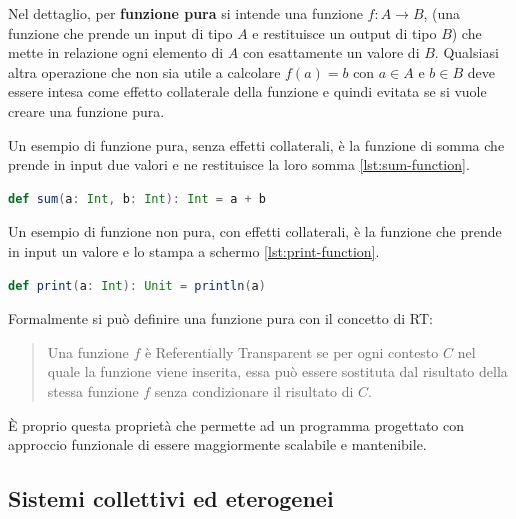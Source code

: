 \documentclass[12pt,a4paper,openright,twoside]{book}
\begin{document}
\label{sec:fp}
Nel dettaglio, per \textbf{funzione pura} si intende una funzione $f:A\to B$, (una funzione che prende un input di tipo $A$ e restituisce un output di tipo $B$) che mette in relazione ogni elemento di $A$ con esattamente un valore di $B$. Qualsiasi altra operazione che non sia utile a calcolare $f(a)=b$ con $a\in A$ e $b\in B$ deve essere intesa come effetto collaterale della funzione e quindi evitata se si vuole creare una funzione pura.

Un esempio di funzione pura, senza effetti collaterali, è la funzione di somma che prende in input due valori e ne restituisce la loro somma \cref{lst:sum-function}. 

\begin{lstlisting}[language=Scala, label={lst:sum-function}, caption={Esempio di funzione pura in Scala}]
    def sum(a: Int, b: Int): Int = a + b
\end{lstlisting}

Un esempio di funzione non pura, con effetti collaterali, è la funzione che prende in input un valore e lo stampa a schermo \cref{lst:print-function}.

\begin{lstlisting}[language=Scala, label={lst:print-function}, caption={Esempio di funzione non pura in Scala}]
    def print(a: Int): Unit = println(a)
\end{lstlisting}

Formalmente si può definire una funzione pura con il concetto di \ac{RT}\cite{Hunt2018}:

\begin{quote}
    Una funzione $f$ è Referentially Transparent se per ogni contesto $C$ nel quale la funzione viene inserita, essa può essere sostituta dal risultato della stessa funzione $f$ senza condizionare il risultato di $C$.
\end{quote}

È proprio questa proprietà che permette ad un programma progettato con approccio funzionale di essere maggiormente scalabile e mantenibile.

\subsection{Sistemi collettivi ed eterogenei} 
\end{document}
